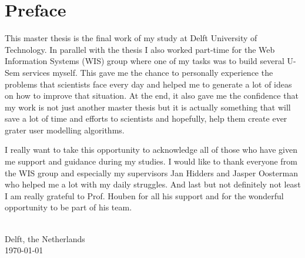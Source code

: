 
\chapter{\label{cha:Preface}Preface}

This master thesis is the final work of my study at Delft University of Technology. In parallel with the thesis I also worked part-time for the Web Information Systems (WIS) group where one of my tasks was to build several U-Sem services myself. This gave me the chance to personally experience the problems that scientists face every day and helped me to generate a lot of ideas on how to improve that situation. At the end, it also gave me the confidence that my work is not just another master thesis but it is actually something that will save a lot of time and efforts to scientists and hopefully, help them create ever grater user modelling algorithms.

I really want to take this opportunity to acknowledge all of those who have given me support and guidance during my studies. I would like to thank everyone from the WIS group and especially my supervisors Jan Hidders and Jasper Oosterman who helped me a lot with my daily struggles. And last but not definitely not least I am really grateful to Prof. Houben for all his support and for the wonderful opportunity to be part of his team.


\vskip1cm 

\begin{flushright}
\theauthor\\
 Delft, the Netherlands \\
 \today\\
 
\par\end{flushright}
